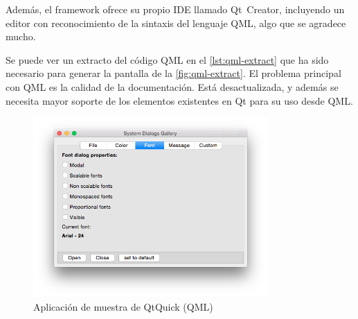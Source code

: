 Además, el framework ofrece su propio IDE llamado Qt~Creator, incluyendo un editor con reconocimiento de la sintaxis del lenguaje QML, algo que se agradece mucho.

Se puede ver un extracto del código QML en el \autoref{lst:qml-extract} que ha sido necesario para generar la pantalla de la \autoref{fig:qml-extract}. El problema principal con QML es la calidad de la documentación. Está desactualizada, y además se necesita mayor soporte de los elementos existentes en Qt para su uso desde QML.

\begin{figure}[htbp]
\centering
\includegraphics[width=0.8\textwidth,trim=56pt 80pt 56pt 30pt,clip]{qml-extract}
\caption{Aplicación de muestra de QtQuick (QML)}
\label{fig:qml-extract}
\end{figure}


